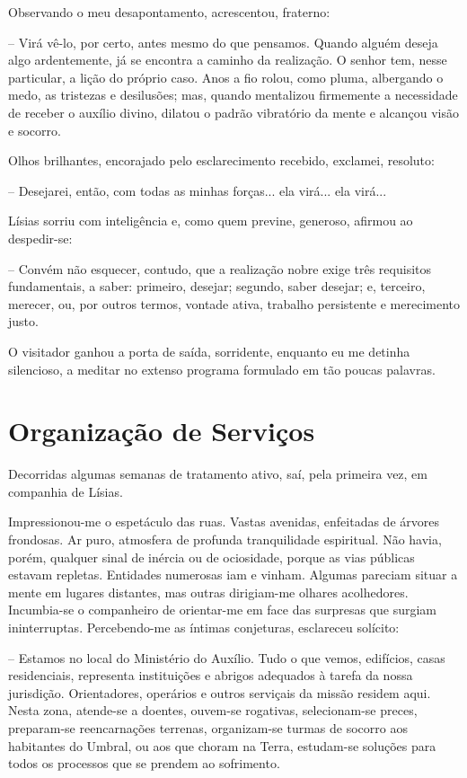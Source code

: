\documentclass[portuguese,12pt,a4paper]{scrbook}
\begin{document}
	Observando o meu desapontamento, acrescentou, fraterno:
	
	
	– Virá vê-lo, por certo, antes mesmo do que pensamos. Quando alguém deseja algo ardentemente, já se encontra a caminho da realização. O senhor tem, nesse particular, a lição do próprio caso. Anos a fio rolou, como pluma, albergando o medo, as tristezas e desilusões; mas, quando mentalizou firmemente a necessidade de receber o auxílio divino, dilatou o padrão vibratório da mente e alcançou visão e socorro.
	
	Olhos brilhantes, encorajado pelo esclarecimento recebido, exclamei, resoluto:
	
	– Desejarei, então, com todas as minhas forças... ela virá... ela virá...
	
	Lísias sorriu com inteligência e, como quem previne, generoso, afirmou ao despedir-se:
	
	– Convém não esquecer, contudo, que a realização nobre exige três requisitos fundamentais, a saber: primeiro, desejar; segundo, saber desejar; e, terceiro, merecer, ou, por outros termos, vontade ativa, trabalho persistente e merecimento justo.
	
	O visitador ganhou a porta de saída, sorridente, enquanto eu me detinha silencioso, a meditar no extenso programa formulado em tão poucas palavras.
	
	
	\chapter{Organização de Serviços}
	
	Decorridas algumas semanas de tratamento ativo, saí, pela primeira vez, em companhia de Lísias.
	
	Impressionou-me o espetáculo das ruas. Vastas avenidas, enfeitadas de árvores frondosas. Ar puro, atmosfera de profunda tranquilidade espiritual. Não havia, porém, qualquer sinal de inércia ou de ociosidade, porque as vias públicas estavam repletas. Entidades numerosas iam e vinham. Algumas pareciam situar a mente em lugares distantes, mas outras dirigiam-me olhares acolhedores. Incumbia-se o companheiro de orientar-me em face das surpresas que surgiam ininterruptas. Percebendo-me as íntimas conjeturas, esclareceu solícito:
	
	– Estamos no local do Ministério do Auxílio. Tudo o que vemos, edifícios, casas residenciais, representa instituições e abrigos adequados à tarefa da nossa jurisdição. Orientadores, operários e outros serviçais da missão residem aqui. Nesta zona, atende-se a doentes, ouvem-se rogativas, selecionam-se preces, preparam-se reencarnações terrenas, organizam-se turmas de socorro aos habitantes do Umbral, ou aos que choram na Terra, estudam-se soluções para todos os processos que se prendem ao sofrimento.
	
\end{document}
